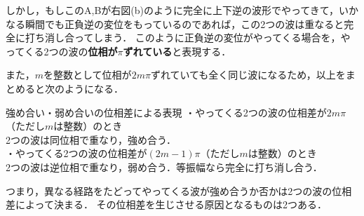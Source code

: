  しかし，もしこのA,Bが右図(b)のように完全に上下逆の波形でやってきて，いかなる瞬間でも正負逆の変位をもっているのであれば，この2つの波は重なると完全に打ち消し合ってしまう．
 このように正負逆の変位がやってくる場合を，やってくる2つの波の{\bf 位相が$\pi$ずれている}と表現する．
 
 また，$m$を整数として位相が$2m\pi$ずれていても全く同じ波になるため，以上をまとめると次のようになる．
 
  \begin{matome}{強め合い・弱め合いの位相差による表現}
・やってくる2つの波の位相差が$2m\pi$（ただし$m$は整数）のとき\\
 \hspace{3mm} 2つの波は同位相で重なり，強め合う．\\
・やってくる2つの波の位相差が$(2m-1)\pi$（ただし$m$は整数）のとき\\
 \hspace{3mm} 2つの波は逆位相で重なり，弱め合う．等振幅なら完全に打ち消し合う． 
 \end{matome}
 
 つまり，異なる経路をたどってやってくる波が強め合うか否かは2つの波の位相差によって決まる．
 その位相差を生じさせる原因となるものは2つある．
 
